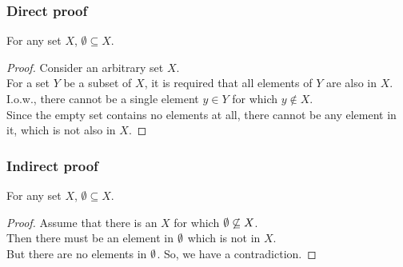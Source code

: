 \documentclass[fleqn,10pt,serif,xcolor=svgnames,xcolor=table,aspectratio=169,handout]{beamer}
\begin{document}
\begin{frame}
  \frametitle{Direct proof}

  \begin{mfproposition}
    \label{prop:emptyset-subset-of-any-X}
    For any set $X$, $\emptyset \subseteq X$.
  \end{mfproposition}

  \pause

  \begin{proof}
    Consider an arbitrary set $X$.\\ \pause
    For a set $Y$ be a subset of $X$, it is required that all elements of $Y$ are also in $X$.\\ \pause
    I.o.w., there cannot be a single element $y \in Y$ for which $y \not \in X$. \\ \pause
    Since the empty set contains no elements at all, there cannot be any element in it, which is not also in $X$.
  \end{proof}

\end{frame}

\begin{frame}
  \frametitle{Indirect proof}

  \begin{mfproposition}
    \label{prop:emptyset-subset-of-any-X}
    For any set $X$, $\emptyset \subseteq X$.
  \end{mfproposition}

  \pause

  \begin{proof}
    Assume that there is an $X$ for which $\emptyset \not \subseteq X$. \\ \pause
    Then there must be an element in $\emptyset$ which is not in $X$. \\ \pause
    But there are no elements in $\emptyset$. So, we have a contradiction.
  \end{proof}

\end{frame}
\end{document}
